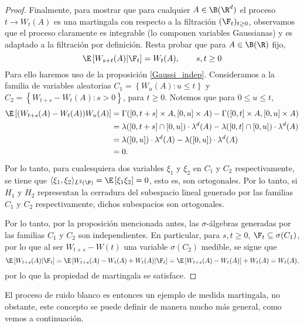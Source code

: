 \begin{proof}
 Finalmente, para mostrar que para cualquier $A\in \B(\R^{d})$ el proceso $t\to W_t(A)$ es una martingala con respecto a la filtración $(\F_t)_{t\geq0}$, observamos que el proceso claramente es integrable (lo componen variables Gaussianas) y es adaptado a la filtración por definición. Resta probar que para $A\in \B(\R)$ fijo,
 \[
 \E\left[W_{s+t}(A)\lvert \F_t\right]=W_t(A), \qquad s,t\geq0  
 \]
 Para ello haremos uso de la proposición \ref{Gaussi_indep}. Consideramos a la familia de variables aleatorias $C_1=\left\{W_u(A):u\leq t\right\}$ y
 $C_2=\left\{W_{t+s}-W_t(A):s>0 \right\}$, para $t\geq0$. Notemos que para $0\le u\le t$,
 \begin{align*}
   \E\left[(W_{t+s}(A)-W_t(A))W_u(A)\right]&=\Gamma([0,t+s]\times A, [0,u]\times A)-\Gamma([0,t]\times A,[0,u]\times A)\\
   &=\lambda([0,t+s]\cap[0,u])\cdot\lambda^{d}(A)-\lambda([0,t]\cap[0,u])\cdot\lambda^{d}(A)\\
   &=\lambda([0,u])\cdot\lambda^{d}(A)-\lambda([0,u])\cdot\lambda^{d}(A)\\
   &=0.
 \end{align*}
 Por lo tanto, para cualesquiera dos variables $\xi_1$ y $\xi_2$ en $C_1$ y $C_2$ respectivamente, se tiene que $\langle \xi_1,\xi_2\rangle_{L^2(\P)}= \E\left[\xi_1\xi_2\right]=0$, esto es, son ortogonales. Por lo tanto, si $H_1$ y $H_2$ representan la cerradura del subespacio lineal generado por las familias $C_1$ y $C_2$ respectivamente, dichos subespacios son ortogonales.
 
 Por lo tanto, por la proposición mencionada antes, las $\sigma$-álgebras generadas por las familias $C_1$ y $C_2$ son independientes. En particular, para $s,t\geq0$, $\F_t\subseteq \sigma(C_1)$, por lo que al ser $W_{t+s}-W(t)$ una variable $\sigma(C_2)$ medible, se sigue que 
 \[
     \E\left[W_{t+s}(A)|\F_t\right]=\E\left[W_{t+s}(A)-W_{t}(A)+W_t(A)|\F_t\right]=\E\left[W_{t+s}(A)-W_t(A)\right]+W_t(A)=W_t(A),
     \]
     por lo que la propiedad de martingala se satisface.  
\end{proof}

El proceso de ruido blanco es entonces un ejemplo de medida martingala, no obstante, este concepto se puede definir de manera mucho más general, como vemos a continuación.


